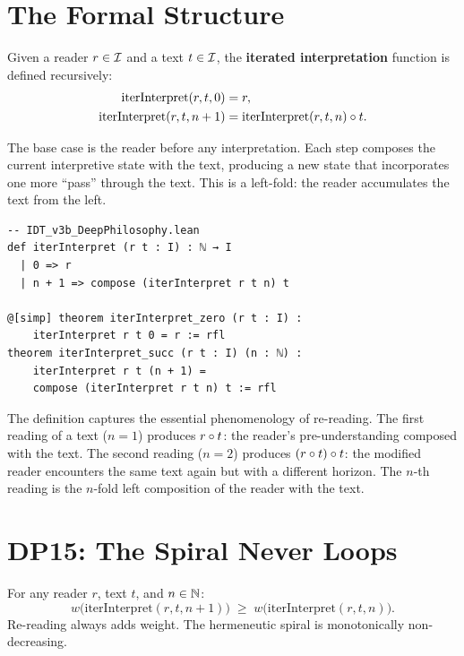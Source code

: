 \section{The Formal Structure}

\begin{definition}
\label{def:iter-interpret}
Given a reader $r \in \mathcal{I}$ and a text $t \in \mathcal{I}$, the
\textbf{iterated interpretation} function is defined recursively:
\begin{align*}
\mathrm{iterInterpret}(r, t, 0) &= r, \\
\mathrm{iterInterpret}(r, t, n+1) &=
\mathrm{iterInterpret}(r, t, n) \circ t.
\end{align*}
\end{definition}

The base case is the reader before any interpretation. Each step composes
the current interpretive state with the text, producing a new state that
incorporates one more ``pass'' through the text. This is a left-fold: the
reader accumulates the text from the left.

\begin{lstlisting}
-- IDT_v3b_DeepPhilosophy.lean
def iterInterpret (r t : I) : ℕ → I
  | 0 => r
  | n + 1 => compose (iterInterpret r t n) t

@[simp] theorem iterInterpret_zero (r t : I) :
    iterInterpret r t 0 = r := rfl
theorem iterInterpret_succ (r t : I) (n : ℕ) :
    iterInterpret r t (n + 1) =
    compose (iterInterpret r t n) t := rfl
\end{lstlisting}

The definition captures the essential phenomenology of re-reading. The
first reading of a text ($n = 1$) produces $r \circ t$: the reader's
pre-understanding composed with the text. The second reading ($n = 2$)
produces $(r \circ t) \circ t$: the modified reader encounters the
same text again but with a different horizon. The $n$-th reading is the
$n$-fold left composition of the reader with the text.

\section{DP15: The Spiral Never Loops}

\begin{theorem}
\label{thm:spiral-never-loops}
For any reader $r$, text $t$, and $n \in \mathbb{N}$:
\[
w\bigl(\mathrm{iterInterpret}(r, t, n+1)\bigr) \;\geq\;
w\bigl(\mathrm{iterInterpret}(r, t, n)\bigr).
\]
Re-reading always adds weight. The hermeneutic spiral is monotonically
non-decreasing.
\end{theorem}

